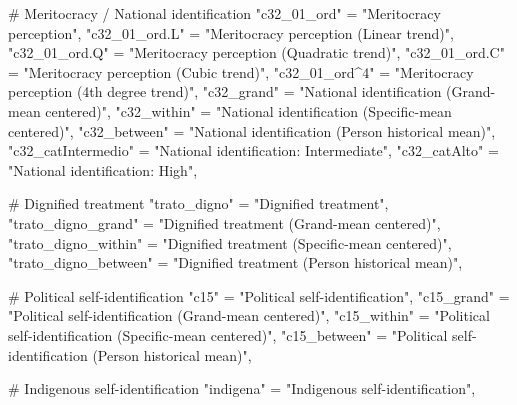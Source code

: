 \documentclass[
  spanish,
  a4paper,
  oneside]{scrbook}
\newenvironment{Shaded}{\begin{snugshade}}{\end{snugshade}}
\newcommand{\CommentTok}[1]{\textcolor[rgb]{0.37,0.37,0.37}{#1}}
\newcommand{\NormalTok}[1]{\textcolor[rgb]{0.00,0.23,0.31}{#1}}
\newcommand{\OtherTok}[1]{\textcolor[rgb]{0.00,0.23,0.31}{#1}}
\newcommand{\StringTok}[1]{\textcolor[rgb]{0.13,0.47,0.30}{#1}}
\begin{document}
\begin{Shaded}
\begin{Highlighting}[]
  \CommentTok{\# Meritocracy / National identification}
  \StringTok{"c32\_01\_ord"}             \OtherTok{=} \StringTok{"Meritocracy perception"}\NormalTok{,}
  \StringTok{"c32\_01\_ord.L"}           \OtherTok{=} \StringTok{"Meritocracy perception (Linear trend)"}\NormalTok{,}
  \StringTok{"c32\_01\_ord.Q"}           \OtherTok{=} \StringTok{"Meritocracy perception (Quadratic trend)"}\NormalTok{,}
  \StringTok{"c32\_01\_ord.C"}           \OtherTok{=} \StringTok{"Meritocracy perception (Cubic trend)"}\NormalTok{,}
  \StringTok{"c32\_01\_ord\^{}4"}           \OtherTok{=} \StringTok{"Meritocracy perception (4th degree trend)"}\NormalTok{,}
  \StringTok{"c32\_grand"}              \OtherTok{=} \StringTok{"National identification (Grand{-}mean centered)"}\NormalTok{,}
  \StringTok{"c32\_within"}             \OtherTok{=} \StringTok{"National identification (Specific{-}mean centered)"}\NormalTok{,}
  \StringTok{"c32\_between"}            \OtherTok{=} \StringTok{"National identification (Person historical mean)"}\NormalTok{,}
  \StringTok{"c32\_catIntermedio"}      \OtherTok{=} \StringTok{"National identification: Intermediate"}\NormalTok{,}
  \StringTok{"c32\_catAlto"}            \OtherTok{=} \StringTok{"National identification: High"}\NormalTok{,}

  \CommentTok{\# Dignified treatment}
  \StringTok{"trato\_digno"}            \OtherTok{=} \StringTok{"Dignified treatment"}\NormalTok{,}
  \StringTok{"trato\_digno\_grand"}      \OtherTok{=} \StringTok{"Dignified treatment (Grand{-}mean centered)"}\NormalTok{,}
  \StringTok{"trato\_digno\_within"}     \OtherTok{=} \StringTok{"Dignified treatment (Specific{-}mean centered)"}\NormalTok{,}
  \StringTok{"trato\_digno\_between"}    \OtherTok{=} \StringTok{"Dignified treatment (Person historical mean)"}\NormalTok{,}

  \CommentTok{\# Political self{-}identification}
  \StringTok{"c15"}                    \OtherTok{=} \StringTok{"Political self{-}identification"}\NormalTok{,}
  \StringTok{"c15\_grand"}              \OtherTok{=} \StringTok{"Political self{-}identification (Grand{-}mean centered)"}\NormalTok{,}
  \StringTok{"c15\_within"}             \OtherTok{=} \StringTok{"Political self{-}identification (Specific{-}mean centered)"}\NormalTok{,}
  \StringTok{"c15\_between"}            \OtherTok{=} \StringTok{"Political self{-}identification (Person historical mean)"}\NormalTok{,}

  \CommentTok{\# Indigenous self{-}identification}
  \StringTok{"indigena"}               \OtherTok{=} \StringTok{"Indigenous self{-}identification"}\NormalTok{,}


\end{Highlighting}
\end{Shaded}
\end{document}
